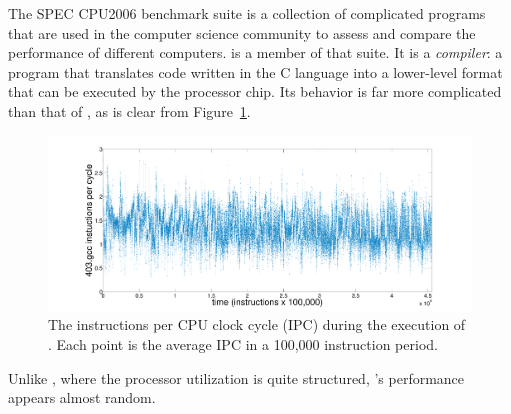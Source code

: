The SPEC CPU2006 benchmark suite \cite{spec} is a collection of
complicated programs that are used in the computer science community
to assess and compare the performance of different computers.  \gcc is
a member of that suite.
% 
% 
It is a \emph{compiler}: a program that translates code written in the
C language into a lower-level format that can be executed by the
processor chip.  Its behavior is far more complicated than that of
\col, as is clear from Figure~\ref{fig:gcc-ts}.
  \begin{figure}[t]
  \centering
    \includegraphics[width=\columnwidth]{figs/gccfullts}
    \caption{The instructions per CPU clock cycle (IPC) during the
      execution of \gcc. Each point is the average IPC in a 100,000
      instruction period.}
    \label{fig:gcc-ts}
  \end{figure}
Unlike \col, where the processor utilization is quite structured,
\gcc's performance appears almost random.

